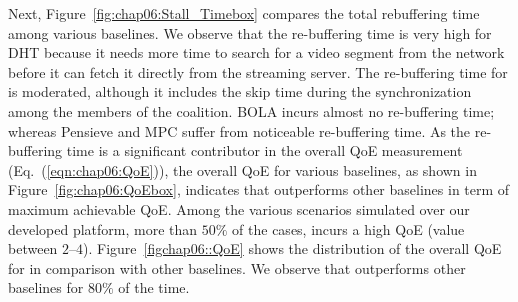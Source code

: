 Next, Figure~\ref{fig:chap06:Stall_Timebox} compares the total rebuffering time among various baselines. We observe that the re-buffering time is very high for DHT because it needs more time to search for a video segment from the network before it can fetch it directly from the streaming server. The re-buffering time for {\our} is moderated, although it includes the skip time during the synchronization among the members of the coalition. BOLA incurs almost no re-buffering time; whereas Pensieve and MPC suffer from noticeable re-buffering time. As the re-buffering time is a significant contributor in the overall QoE measurement (Eq.~(\ref{eqn:chap06:QoE})), the overall QoE for various baselines, as shown in Figure~\ref{fig:chap06:QoEbox}, indicates that {\our} outperforms other baselines in term of maximum achievable QoE.  Among the various scenarios simulated over our developed platform, more than $50\%$ of the cases, {\our} incurs a high QoE (value between $2$--$4$). Figure~\ref{figchap06::QoE} shows the distribution of the overall QoE for {\our} in comparison with other baselines. We observe that {\our} outperforms other baselines for $80\%$ of the time.


